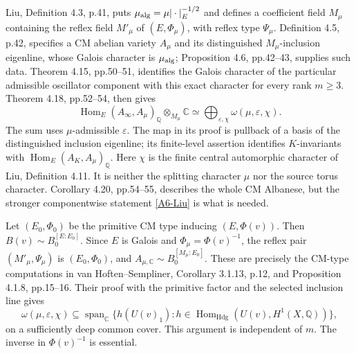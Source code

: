 \documentclass[11pt]{article}
\newcommand{\Q}{\mathbb Q}\newcommand{\C}{\mathbb C}\newcommand{\Z}{\mathbb Z}\newcommand{\R}{\mathbb R}\newcommand{\A}{\mathbb A}\newcommand{\OO}{\mathcal O}
\newcommand{\Hdg}{\operatorname{Hdg}}\newcommand{\CH}{\operatorname{CH}}\newcommand{\Hom}{\operatorname{Hom}}\newcommand{\Tr}{\operatorname{Tr}}\newcommand{\SU}{\operatorname{SU}}\newcommand{\U}{\operatorname{U}}
\theoremstyle{definition}\newtheorem{definition}[theorem]{Definition}\newtheorem{remark}[theorem]{Remark}
\begin{document}
Liu, Definition 4.3, p.41, puts
$\mu_{\rm alg}=\mu|\cdot|_E^{-1/2}$ and defines a coefficient
field $M_\mu$ containing the reflex field $M'_\mu$ of
$(E,\Phi_\mu)$, with reflex type $\Psi_\mu$.
Definition 4.5, p.42, specifies a CM abelian variety $A_\mu$ and its
distinguished $M_\mu$-inclusion eigenline, whose Galois character is
$\mu_{\rm alg}$; Proposition 4.6, pp.42--43, supplies such data.
Theorem 4.15, pp.50--51, identifies the Galois character of the
particular admissible oscillator component with this exact character
for every rank $m\geq3$. Theorem 4.18, pp.52--54, then gives
\begin{equation}\label{A6-Liu}
 \Hom_E(A_\infty,A_\mu)_\Q\otimes_{M_\mu}\C
       \simeq\bigoplus_{\varepsilon,\chi}
                         \omega(\mu,\varepsilon,\chi).
\end{equation}
The sum uses $\mu$-admissible $\varepsilon$. The map in its proof
is pullback of a basis of the distinguished inclusion eigenline;
its finite-level assertion identifies $K$-invariants with
$\Hom_E(A_K,A_\mu)_\Q$. Here $\chi$ is the finite central
automorphic character of Liu, Definition 4.11. It is neither the
splitting character $\mu$ nor the source torus character.
Corollary 4.20, pp.54--55, describes the whole CM Albanese, but the
stronger componentwise statement \eqref{A6-Liu} is what is needed.

Let $(E_0,\Phi_0)$ be the primitive CM type inducing
$(E,\Phi(v))$. Then $B(v)\sim B_0^{[E:E_0]}$. Since $E$ is
Galois and $\Phi_\mu=\Phi(v)^{-1}$, the reflex pair
$(M'_\mu,\Psi_\mu)$ is $(E_0,\Phi_0)$, and
$A_{\mu,\C}\sim B_0^{[M_\mu:E_0]}$. These are precisely the
CM-type computations in van Hoften--Sempliner, Corollary 3.1.13,
p.12, and Proposition 4.1.8, pp.15--16. Their proof with the
primitive factor and the selected inclusion line gives
\begin{equation}\label{A6-extraction}
 \omega(\mu,\varepsilon,\chi)
 \subseteq
 \operatorname{span}_{\C}\{h(U(v)_1):
       h\in\Hom_{\Hdg}(U(v),H^1(X,\Q))\},
\end{equation}
on a sufficiently deep common cover. This argument is independent
of $m$. The inverse in $\Phi(v)^{-1}$ is essential.
\end{document}
